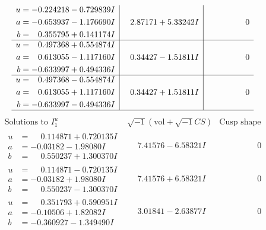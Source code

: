 \documentclass[1p]{elsarticle_modified}
\theoremstyle{definition}
\newcommand{\I}{\sqrt{-1}}
\begin{document}
$$\begin{array}{c|c|c}
\begin{aligned}
u &= -0.224218 - 0.729839 I \\
a &= -0.653937 - 1.176690 I \\
b &= \phantom{-}0.355795 + 0.141174 I\end{aligned}
 & \phantom{-}2.87171 + 5.33242 I & \phantom{-0.000000 } 0 \\ \hline\begin{aligned}
u &= \phantom{-}0.497368 + 0.554874 I \\
a &= \phantom{-}0.613055 - 1.117160 I \\
b &= -0.633997 + 0.494336 I\end{aligned}
 & \phantom{-}0.34427 - 1.51811 I & \phantom{-0.000000 } 0 \\ \hline\begin{aligned}
u &= \phantom{-}0.497368 - 0.554874 I \\
a &= \phantom{-}0.613055 + 1.117160 I \\
b &= -0.633997 - 0.494336 I\end{aligned}
 & \phantom{-}0.34427 + 1.51811 I & \phantom{-0.000000 } 0\\
 \hline 
 \end{array}$$\newpage$$\begin{array}{c|c|c}  
\text{Solutions to }I^u_{1}& \I (\text{vol} + \sqrt{-1}CS) & \text{Cusp shape}\\
 \hline 
\begin{aligned}
u &= \phantom{-}0.114871 + 0.720135 I \\
a &= -0.03182 - 1.98080 I \\
b &= \phantom{-}0.550237 + 1.300370 I\end{aligned}
 & \phantom{-}7.41576 - 6.58321 I & \phantom{-0.000000 } 0 \\ \hline\begin{aligned}
u &= \phantom{-}0.114871 - 0.720135 I \\
a &= -0.03182 + 1.98080 I \\
b &= \phantom{-}0.550237 - 1.300370 I\end{aligned}
 & \phantom{-}7.41576 + 6.58321 I & \phantom{-0.000000 } 0 \\ \hline\begin{aligned}
u &= \phantom{-}0.351793 + 0.590951 I \\
a &= -0.10506 + 1.82082 I \\
b &= -0.360927 - 1.349490 I\end{aligned}
 & \phantom{-}3.01841 - 2.63877 I & \phantom{-0.000000 } 0 \\ \hline\begin{aligned}

\end{aligned}
\end{array}$$
\end{document}
